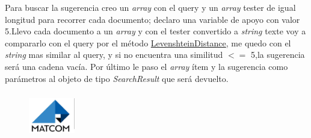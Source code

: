 \documentclass[a4paper,12pt]{article}
\begin{document}
Para buscar la sugerencia creo un \emph{array} con el query y
un \emph{array} tester de igual longitud para recorrer cada documento; declaro una
variable de apoyo con valor 5.Llevo cada documento a un \emph{array} y con el
tester convertido a \emph{string} texte voy a compararlo con el query por el método
\underline{LevenshteinDistance}, me quedo con el \emph{string} mas similar al query, y si no
encuentra una similitud $<=$ 5,la sugerencia será una cadena vacía. Por último le paso el \emph{array} ítem y la sugerencia como parámetros al objeto de
tipo \emph{SearchResult} que será devuelto.
\begin{figure}[b]
    \hspace{13cm}
    \includegraphics[width=2cm,height=2cm]{Logo de Matcom.png}
\end{figure}
\end{document}
